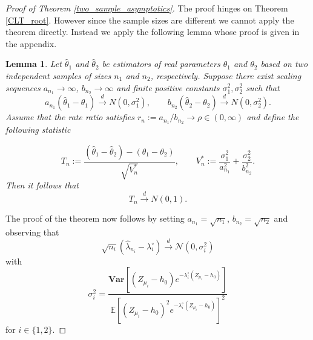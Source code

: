 \documentclass[12pt]{article}
\numberwithin{equation}{section}
\newtheorem{lemma}{Lemma}[section]
\begin{document}
\begin{proof}[Proof of Theorem \ref{two_sample_asymptotics}]
The proof hinges on Theorem \ref{CLT_root}. However since the sample sizes are different we cannot apply the theorem directly. Instead we apply the following lemma whose proof is given in the appendix.

\begin{lemma}{\label{two_sample_asymptotics_lemma}}
Let $\hat{\theta}_1$ and $\hat{\theta}_2$ be estimators of real parameters $\theta_1$ and $\theta_2$ based on two \emph{independent} samples of sizes $n_1$ and $n_2$, respectively. Suppose there exist scaling sequences $a_{n_1} \to \infty$, $b_{n_2} \to \infty$ and finite positive constants $\sigma_1^2, \sigma_2^2$ such that
\[
a_{n_1}(\hat{\theta}_1 - \theta_1) \xrightarrow{d} N(0, \sigma_1^2), 
\qquad 
b_{n_2}(\hat{\theta}_2 - \theta_2) \xrightarrow{d} N(0, \sigma_2^2).
\]
Assume that the rate ratio satisfies $r_n := a_{n_1}/b_{n_2} \to \rho \in (0, \infty)$ and define the following statistic


\[
T_n := \frac{(\hat{\theta}_1 - \hat{\theta}_2)-(\theta_1-\theta_2)}{\sqrt{V_n^\ast}},
\qquad 
V_n^\ast := \frac{\sigma_1^2}{a_{n_1}^2} + \frac{\sigma_2^2}{b_{n_2}^2}.
\]
Then it follows that 
\[
T_n \xrightarrow{d} N(0,1).
\]
\end{lemma}
The proof of the theorem now follows by setting $a_{n_1}=\sqrt{n_1}$, $b_{n_2}=\sqrt{n_2}$ and observing that
\[
\sqrt{n_i}(\hat{\lambda}_{n_i} - \lambda_i^{\circ}) \xrightarrow{d} \mathcal{N}\left(0, \sigma^2_i\right)
\]
with $$\sigma^2_i=\frac{\mathbf{Var}\left[(Z_{\mu_i}-h_0)e^{-\lambda_i^{\circ}(Z_{\mu_i}-h_0)}\right]}{\mathbb{E}\left[(Z_{\mu_i}-h_0)^2e^{-\lambda_i^{\circ}(Z_{\mu_i}-h_0)}\right]^2}$$
for $i \in \{1,2\}$.


\end{proof}
\end{document}
